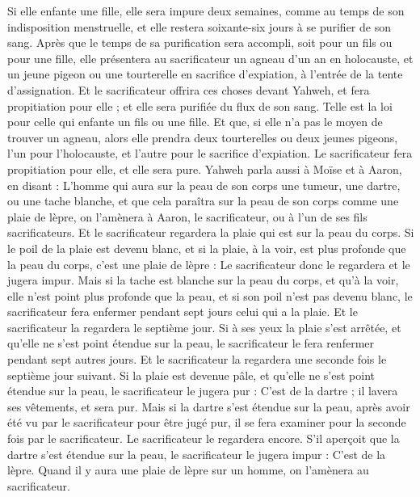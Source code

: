 \begin{multicols}{2}
Si elle enfante une fille, elle sera impure deux semaines, comme au temps de son indisposition menstruelle, et elle restera soixante-six jours à se purifier de son sang.
Après que le temps de sa purification sera accompli, soit pour un fils ou pour une fille, elle présentera au sacrificateur un agneau d'un an en holocauste, et un jeune pigeon ou une tourterelle en sacrifice d’expiation, à l'entrée de la tente d'assignation.
Et le sacrificateur offrira ces choses devant Yahweh, et fera propitiation pour elle ; et elle sera purifiée du flux de son sang. Telle est la loi pour celle qui enfante un fils ou une fille.
Et que, si elle n'a pas le moyen de trouver un agneau, alors elle prendra deux tourterelles ou deux jeunes pigeons, l'un pour l'holocauste, et l'autre pour le sacrifice d'expiation. Le sacrificateur fera propitiation pour elle, et elle sera pure.
\VerseOne{}Yahweh parla aussi à Moïse et à Aaron, en disant :
L'homme qui aura sur la peau de son corps une tumeur, une dartre, ou une tache blanche, et que cela paraîtra sur la peau de son corps comme une plaie de lèpre, on l'amènera à Aaron, le sacrificateur, ou à l'un de ses fils sacrificateurs.
Et le sacrificateur regardera la plaie qui est sur la peau du corps. Si le poil de la plaie est devenu blanc, et si la plaie, à la voir, est plus profonde que la peau du corps, c'est une plaie de lèpre : Le sacrificateur donc le regardera et le jugera impur.
Mais si la tache est blanche sur la peau du corps, et qu'à la voir, elle n'est point plus profonde que la peau, et si son poil n'est pas devenu blanc, le sacrificateur fera enfermer pendant sept jours celui qui a la plaie.
Et le sacrificateur la regardera le septième jour. Si à ses yeux la plaie s'est arrêtée, et qu'elle ne s'est point étendue sur la peau, le sacrificateur le fera renfermer pendant sept autres jours.
Et le sacrificateur la regardera une seconde fois le septième jour suivant. Si la plaie est devenue pâle, et qu'elle ne s'est point étendue sur la peau, le sacrificateur le jugera pur : C'est de la dartre ; il lavera ses vêtements, et sera pur.
Mais si la dartre s'est étendue sur la peau, après avoir été vu par le sacrificateur pour être jugé pur, il se fera examiner pour la seconde fois par le sacrificateur.
Le sacrificateur le regardera encore. S'il aperçoit que la dartre s'est étendue sur la peau, le sacrificateur le jugera impur : C'est de la lèpre.
Quand il y aura une plaie de lèpre sur un homme, on l'amènera au sacrificateur.

\end{multicols}
